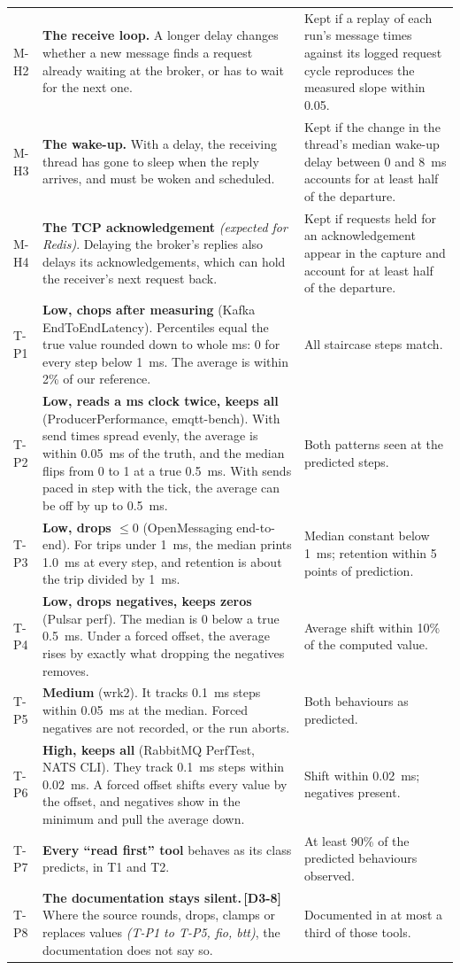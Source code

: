 \documentclass[11pt]{article}
\newcommand{\gl}[1]{{\color{soft}\itshape\small (#1)}}
\newcommand{\chgold}[1]{\,{\color{oldcol}\bfseries\footnotesize[#1]}}
\begin{document}
{\begin{longtable}{@{}p{1.0cm} p{9.5cm} p{5.6cm}@{}}
M-H2 & \textbf{The receive loop.} A longer delay changes whether a new message finds a request already waiting at the broker, or has to wait for the next one. & Kept if a replay of each run's message times against its logged request cycle reproduces the measured slope within 0.05. \\
M-H3 & \textbf{The wake-up.} With a delay, the receiving thread has gone to sleep when the reply arrives, and must be woken and scheduled. & Kept if the change in the thread's median wake-up delay between 0 and 8~ms accounts for at least half of the departure. \\
M-H4 & \textbf{The TCP acknowledgement} \gl{expected for Redis}. Delaying the broker's replies also delays its acknowledgements, which can hold the receiver's next request back. & Kept if requests held for an acknowledgement appear in the capture and account for at least half of the departure. \\
\midrule
T-P1 & \textbf{Low, chops after measuring} (Kafka EndToEndLatency). Percentiles equal the true value rounded down to whole ms: 0 for every step below 1~ms. The average is within 2\% of our reference. & All staircase steps match. \\
T-P2 & \textbf{Low, reads a ms clock twice, keeps all} (ProducerPerformance, emqtt-bench). With send times spread evenly, the average is within 0.05~ms of the truth, and the median flips from 0 to 1 at a true 0.5~ms. With sends paced in step with the tick, the average can be off by up to 0.5~ms. & Both patterns seen at the predicted steps. \\
T-P3 & \textbf{Low, drops $\le 0$} (OpenMessaging end-to-end). For trips under 1~ms, the median prints 1.0~ms at every step, and retention is about the trip divided by 1~ms. & Median constant below 1~ms; retention within 5 points of prediction. \\
T-P4 & \textbf{Low, drops negatives, keeps zeros} (Pulsar perf). The median is 0 below a true 0.5~ms. Under a forced offset, the average rises by exactly what dropping the negatives removes. & Average shift within 10\% of the computed value. \\
T-P5 & \textbf{Medium} (wrk2). It tracks 0.1~ms steps within 0.05~ms at the median. Forced negatives are not recorded, or the run aborts. & Both behaviours as predicted. \\
T-P6 & \textbf{High, keeps all} (RabbitMQ PerfTest, NATS CLI). They track 0.1~ms steps within 0.02~ms. A forced offset shifts every value by the offset, and negatives show in the minimum and pull the average down. & Shift within 0.02~ms; negatives present. \\
T-P7 & \textbf{Every ``read first'' tool} behaves as its class predicts, in T1 and T2. & At least 90\% of the predicted behaviours observed. \\
T-P8 & \textbf{The documentation stays silent.}\chgold{D3-8} Where the source rounds, drops, clamps or replaces values \gl{T-P1 to T-P5, fio, btt}, the documentation does not say so. & Documented in at most a third of those tools. \\
\bottomrule
\end{longtable}}
\end{document}
